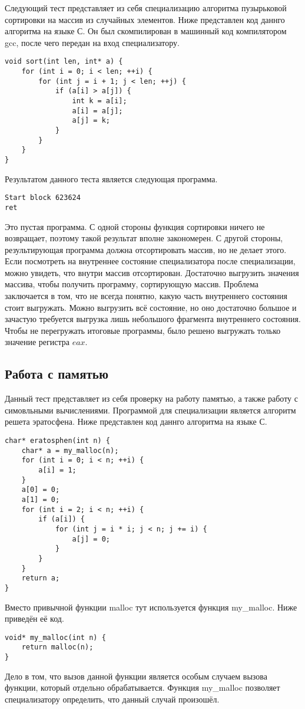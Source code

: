 \documentclass{spbau-diploma}
\begin{document}
Следующий тест представляет из себя специализацию алгоритма пузырьковой сортировки на массив из случайных элементов. Ниже представлен код даннго алгоритма на языке С. Он был скомпилирован в машинный код компилятором gcc, после чего передан на вход специализатору.
\begin{lstlisting}
void sort(int len, int* a) {
    for (int i = 0; i < len; ++i) {
        for (int j = i + 1; j < len; ++j) {
            if (a[i] > a[j]) {
                int k = a[i];
                a[i] = a[j];
                a[j] = k;
            }
        }
    }
}
\end{lstlisting}
Результатом данного теста является следующая программа.
\begin{lstlisting}
Start block 623624
ret
\end{lstlisting}
Это пустая программа. С одной стороны функция сортировки ничего не возвращает, поэтому такой результат вполне закономерен. С другой стороны, результирующая программа должна отсортировать массив, но не делает этого. Если посмотреть на внутреннее состояние специализатора после специализации, можно увидеть, что внутри массив отсортирован. Достаточно выгрузить значения массива, чтобы получить программу, сортирующую массив. Проблема заключается в том, что не всегда понятно, какую часть внутреннего состояния стоит выгружать. Можно выгрузить всё состояние, но оно достаточно большое и зачастую требуется выгрузка лишь небольшого фрагмента внутреннего состояния. Чтобы не перегружать итоговые программы, было решено выгружать только значение регистра $eax$.

\subsection{ Работа с памятью}
Данный тест представляет из себя проверку на работу памятью, а также работу с симовльными вычислениями. Программой для специализации является алгоритм решета эратосфена. Ниже представлен код даннго алгоритма на языке С.
\begin{lstlisting}
char* eratosphen(int n) {
    char* a = my_malloc(n);
    for (int i = 0; i < n; ++i) {
        a[i] = 1;
    }
    a[0] = 0;
    a[1] = 0;
    for (int i = 2; i < n; ++i) {
        if (a[i]) {
            for (int j = i * i; j < n; j += i) {
                a[j] = 0;
            }
        }
    }
    return a;
}
\end{lstlisting}
Вместо привычной функции malloc тут используется функция my\_malloc. Ниже приведён её код.
\begin{lstlisting}
void* my_malloc(int n) {
    return malloc(n);
}
\end{lstlisting}
Дело в том, что вызов данной функции является особым случаем вызова функции, который отдельно обрабатывается. Функция my\_malloc позволяет специализатору определить, что данный случай произошёл. 
\end{document}
